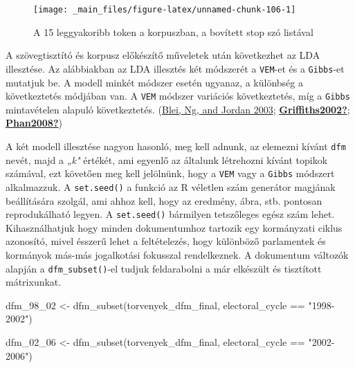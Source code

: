 \documentclass[
]{book}
\newenvironment{Shaded}{\begin{snugshade}}{\end{snugshade}}
\newcommand{\FunctionTok}[1]{\textcolor[rgb]{0.00,0.00,0.00}{#1}}
\newcommand{\NormalTok}[1]{#1}
\newcommand{\OtherTok}[1]{\textcolor[rgb]{0.56,0.35,0.01}{#1}}
\newcommand{\SpecialCharTok}[1]{\textcolor[rgb]{0.00,0.00,0.00}{#1}}
\newcommand{\StringTok}[1]{\textcolor[rgb]{0.31,0.60,0.02}{#1}}
\begin{document}
\begin{figure}

{\centering \texttt{[image: \_main\_files/figure-latex/unnamed-chunk-106-1]} 

}

\caption{A 15 leggyakoribb token a korpuszban, a bovített stop szó listával}\label{fig:unnamed-chunk-106}
\end{figure}

A szövegtisztító és korpusz előkészítő műveletek után következhet az LDA
illesztése. Az alábbiakban az LDA illesztés két módszerét a
\texttt{VEM}-et és a \texttt{Gibbs}-et mutatjuk be. A modell minkét
módszer esetén ugyanaz, a különbség a következtetés módjában van. A
\texttt{VEM} módszer variációs következtetés, míg a \texttt{Gibbs}
mintavételen alapuló következtetés.
(\protect\hyperlink{ref-blei2003}{Blei, Ng, and Jordan 2003};
\protect\hyperlink{ref-Griffiths2002}{\textbf{Griffiths2002?}};
\protect\hyperlink{ref-Phan2008}{\textbf{Phan2008?}})

A két modell illesztése nagyon hasonló, meg kell adnunk, az elemezni
kívánt \texttt{dfm} nevét, majd a \emph{„k"} értékét, ami egyenlő az
általunk létrehozni kívánt topikok számával, ezt követően meg kell
jelölnünk, hogy a \texttt{VEM} vagy a \texttt{Gibbs} módszert
alkalmazzuk. A \texttt{set.seed()} a funkció az R véletlen szám
generátor magjának beállítására szolgál, ami ahhoz kell, hogy az
eredmény, ábra, stb. pontosan reprodukálható legyen. A
\texttt{set.seed()} bármilyen tetszőleges egész szám lehet.
Kihasználhatjuk hogy minden dokumentumhoz tartozik egy kormányzati
ciklus azonosító, mivel ésszerű lehet a feltételezés, hogy különböző
parlamentek és kormányok más-más jogalkotási fokusszal rendelkeznek. A
dokumentum változók alapján a \texttt{dfm\_subset()}-el tudjuk
feldarabolni a már elkészült és tisztított mátrixunkat.

\begin{Shaded}
\begin{Highlighting}[]
\NormalTok{dfm\_98\_02 }\OtherTok{\textless{}{-}} \FunctionTok{dfm\_subset}\NormalTok{(torvenyek\_dfm\_final, electoral\_cycle }\SpecialCharTok{==} \StringTok{"1998{-}2002"}\NormalTok{)}

\NormalTok{dfm\_02\_06 }\OtherTok{\textless{}{-}} \FunctionTok{dfm\_subset}\NormalTok{(torvenyek\_dfm\_final, electoral\_cycle }\SpecialCharTok{==} \StringTok{"2002{-}2006"}\NormalTok{)}
\end{Highlighting}
\end{Shaded}
\end{document}
